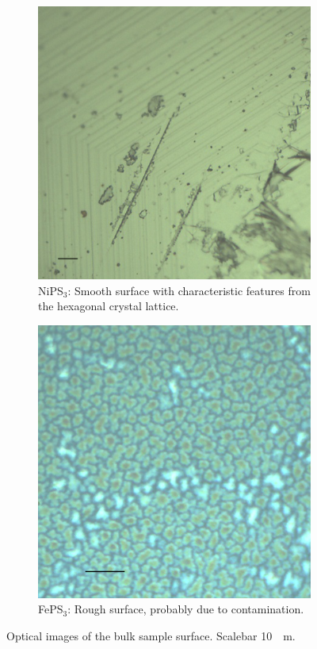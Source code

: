 \documentclass[
	oneside,
	parskip=half,
	a4paper,
]{scrbook}
\begin{document}
\begin{figure}
	\centering
	\begin{subfigure}[t]{.25\textwidth}
		\includegraphics[width=\textwidth]{../../data/2023-11-02/i005_NiPS3_50x-scalebar.png}
		\caption{NiPS$_3$: Smooth surface with characteristic features from the hexagonal crystal lattice.}
		\label{fig:bulk_nips3}
	\end{subfigure}
	\begin{subfigure}[t]{.25\textwidth}
		\includegraphics[width=\textwidth]{../../data/2023-11-02/i009_FePS3_100x-scalebar.png}
		\caption{FePS$_3$: Rough surface, probably due to contamination.}
		\label{fig:bulk_feps3}
	\end{subfigure}
	\caption{Optical images of the bulk sample surface. Scalebar \SI{10}{\mu m}.}	
\end{figure}
\end{document}
